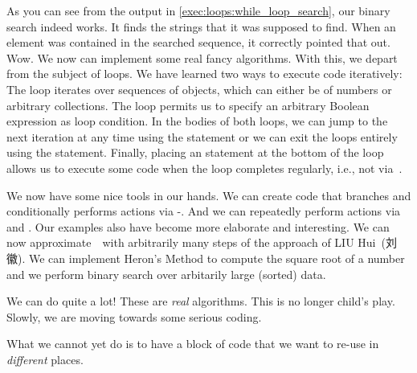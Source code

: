 As you can see from the output in \cref{exec:loops:while_loop_search}, our binary search indeed works.
It finds the strings that it was supposed to find.
When an element was contained in the searched sequence, it correctly pointed that out.
Wow.
We now can implement some real fancy algorithms.%
\endhsection%
%
%
With this, we depart from the subject of loops.
We have learned two ways to execute code iteratively:
The  loop iterates over sequences of objects, which can either be  of numbers or arbitrary collections.
The  loop permits us to specify an arbitrary Boolean expression as loop condition.
In the bodies of both loops, we can jump to the next iteration at any time using the  statement or we can exit the loops entirely using the  statement.
Finally, placing an  statement at the bottom of the loop allows us to execute some code when the loop completes regularly, i.e., not via~.

We now have some nice tools in our hands.
We can create code that branches and conditionally performs actions via -.
And we can repeatedly perform actions via  and .
Our examples also have become more elaborate and interesting.
We can now approximate~\numberPi\ with arbitrarily many steps of the approach of LIU Hui~(刘徽).
We can implement Heron's Method to compute the square root of a number and we perform binary search over arbitarily large (sorted) data.

We can do quite a lot!
These are \emph{real} algorithms.
This is no longer child's play.
Slowly, we are moving towards some serious coding.

What we cannot yet do is to have a block of code that we want to re-use in \emph{different} places.%
\endhsection%
%
\FloatBarrier%
\endhsection%
%
